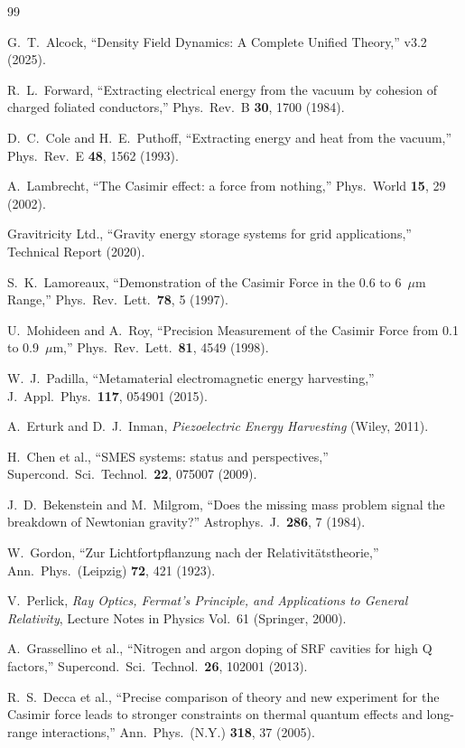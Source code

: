 \documentclass[aps,prd,twocolumn,showpacs,preprintnumbers,superscriptaddress,nofootinbib]{revtex4-2}
\begin{document}
\begin{thebibliography}{99}

G.~T.~Alcock, ``Density Field Dynamics: A Complete Unified Theory,''
v3.2 (2025).

R.~L.~Forward, ``Extracting electrical energy from the vacuum by
cohesion of charged foliated conductors,'' Phys.\ Rev.\ B \textbf{30},
1700 (1984).

D.~C.~Cole and H.~E.~Puthoff, ``Extracting energy and heat from the
vacuum,'' Phys.\ Rev.\ E \textbf{48}, 1562 (1993).

A.~Lambrecht, ``The Casimir effect: a force from nothing,'' Phys.\
World \textbf{15}, 29 (2002).

Gravitricity Ltd., ``Gravity energy storage systems for grid
applications,'' Technical Report (2020).

S.~K.~Lamoreaux, ``Demonstration of the Casimir Force in the 0.6 to
6~$\mu$m Range,'' Phys.\ Rev.\ Lett.\ \textbf{78}, 5 (1997).

U.~Mohideen and A.~Roy, ``Precision Measurement of the Casimir Force
from 0.1 to 0.9~$\mu$m,'' Phys.\ Rev.\ Lett.\ \textbf{81}, 4549 (1998).

W.~J.~Padilla, ``Metamaterial electromagnetic energy harvesting,''
J.\ Appl.\ Phys.\ \textbf{117}, 054901 (2015).

A.~Erturk and D.~J.~Inman, \emph{Piezoelectric Energy Harvesting}
(Wiley, 2011).

H.~Chen et al., ``SMES systems: status and perspectives,'' Supercond.\
Sci.\ Technol.\ \textbf{22}, 075007 (2009).

J.~D.~Bekenstein and M.~Milgrom, ``Does the missing mass problem signal
the breakdown of Newtonian gravity?'' Astrophys.\ J.\ \textbf{286}, 7
(1984).

W.~Gordon, ``Zur Lichtfortpflanzung nach der Relativit\"atstheorie,''
Ann.\ Phys.\ (Leipzig) \textbf{72}, 421 (1923).

V.~Perlick, \emph{Ray Optics, Fermat's Principle, and Applications to
General Relativity}, Lecture Notes in Physics Vol.\ 61 (Springer, 2000).

\bibitem{Grassi2013}
A.~Grassellino et al., ``Nitrogen and argon doping of SRF cavities for
high Q factors,'' Supercond.\ Sci.\ Technol.\ \textbf{26}, 102001
(2013).

R.~S.~Decca et al., ``Precise comparison of theory and new experiment
for the Casimir force leads to stronger constraints on thermal quantum
effects and long-range interactions,'' Ann.\ Phys.\ (N.Y.) \textbf{318},
37 (2005).

\end{thebibliography}
\end{document}
